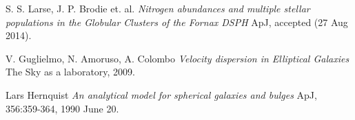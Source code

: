 \documentclass[a4paper, 11pt, oneside]{Thesis}  %
\begin{document}
\begin{thebibliography}{9}
S. S. Larse, J. P. Brodie et. al.
\textit{Nitrogen abundances and multiple stellar populations in the Globular Clusters of the Fornax DSPH}
ApJ, accepted (27 Aug 2014).

V. Guglielmo, N. Amoruso, A. Colombo
\textit{Velocity dispersion in Elliptical Galaxies}
The Sky as a laboratory, 2009.

Lars Hernquist
\textit{An analytical model for spherical galaxies and bulges}
ApJ, 356:359-364, 1990 June 20.

\end{thebibliography}

\label{Bibliography}
\end{document}
